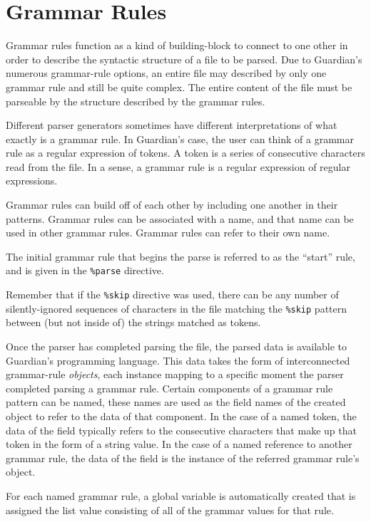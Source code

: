 

\section{Grammar Rules}
{
	Grammar rules function as a kind of building-block to connect to one
	other in order to describe the syntactic structure of a file to be parsed.
	Due to Guardian's numerous grammar-rule options, an entire file
	may described by only one grammar rule and still be quite
	complex.
	The entire content of the file must be parseable by
	the structure described by the grammar rules.
	
	Different parser generators sometimes have different interpretations of
	what exactly is a grammar rule. In Guardian's case, the user can think
	of a grammar rule as a regular expression of tokens. A token is a series of
	consecutive characters read from the file.
	In a sense, a grammar rule is a regular expression of regular expressions.
	
	Grammar rules can build off of each other by including one another in their
	patterns.
	Grammar rules can be associated with a name, and that name can be used in
	other grammar rules. Grammar rules can refer to their own name.
	
	The initial grammar rule that begins the parse is referred to as the
	``start'' rule, and is given in the \texttt{\%parse} directive.
	
	Remember that if the \texttt{\%skip} directive was used, there can be
	any number of silently-ignored sequences of characters in the file matching
	the \texttt{\%skip} pattern between
	(but not inside of) the strings matched as tokens.
	
	Once the parser has completed parsing the file, the parsed data is available
	to Guardian's programming language. This data takes the form of
	interconnected grammar-rule \textit{objects}, each instance mapping to a
	specific moment the parser completed parsing a grammar rule.
	Certain components of a grammar rule pattern can be named, these names
	are used as the field names of the created object to refer to the data of
	that component. In the case of a named token, the data of the field typically
	refers to the consecutive characters that make up that token in the form
	of a string value.
	In the case of a named reference to another grammar rule, the data of the
	field is the instance of the referred grammar rule's object.
	
	For each named grammar rule, a global variable is automatically created
	that is assigned the list value consisting of all of the grammar values
	for that rule.
	
}

